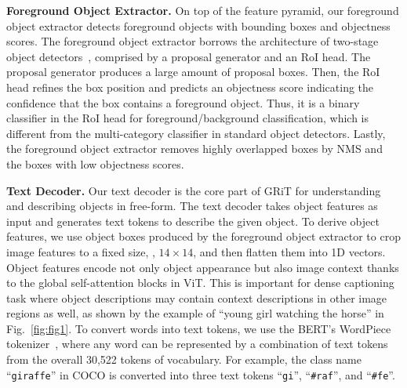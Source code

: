 \documentclass[10pt,twocolumn,letterpaper]{article}
\newcommand{\myparagraph}[1]{{\vspace{0.5em} \noindent \bf #1}}
\begin{document}
\myparagraph{Foreground Object Extractor.} On top of the feature pyramid, our foreground object extractor detects foreground objects with bounding boxes and objectness scores. The foreground object extractor borrows the architecture of two-stage object detectors~\cite{ren2015faster,cai2018cascade,zhou2021probabilistic}, comprised by a proposal generator and an RoI head. The proposal generator produces a large amount of proposal boxes. Then, the RoI head refines the box position and predicts an objectness score indicating the confidence that the box contains a foreground object. Thus, it is a binary classifier in the RoI head for foreground/background classification, which is different from the multi-category classifier in standard object detectors. Lastly, the foreground object extractor removes highly overlapped boxes by NMS and the boxes with low objectness scores.

\myparagraph{Text Decoder.} Our text decoder is the core part of GRiT for understanding and describing objects in free-form. The text decoder takes object features as input and generates text tokens to describe the given object. To derive object features, we use object boxes produced by the foreground object extractor to crop image features to a fixed size, \eg, $14\times14$, and then flatten them into 1D vectors. Object features encode not only object appearance but also image context thanks to the global self-attention blocks in ViT. This is important for dense captioning task where object descriptions may contain context descriptions in other image regions as well, as shown by the example of ``young girl watching the horse'' in Fig.~\ref{fig:fig1}. To convert words into text tokens, we use the BERT's WordPiece tokenizer~\cite{devlin2018bert,wu2016google,schuster2012japanese}, where any word can be represented by a combination of text tokens from the overall 30,522 tokens of vocabulary. For example, the class name ``\texttt{giraffe}'' in COCO is converted into three text tokens ``\texttt{gi}'', ``\texttt{\#raf}'', and ``\texttt{\#fe}''. 
\end{document}
